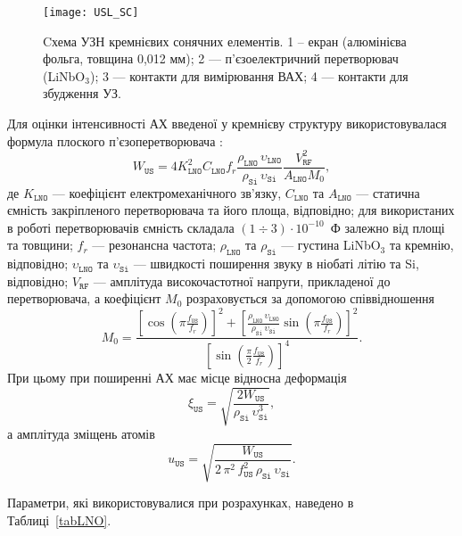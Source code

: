 \begin{figure}
\center
\texttt{[image: USL\_SC]}%
\caption{\label{figUSL:SC}
Cхема УЗН кремнієвих сонячних елементів.
1 --  екран (алюмінієва фольга, товщина 0,012 мм);
2 --- п'єзоелектричний перетворювач (LiNbO$_3$);
3 --- контакти для вимірювання ВАХ;
4 --- контакти для збудження УЗ.
}
\end{figure}


Для оцінки інтенсивності АХ введеної у кремнієву структуру використовувалася формула плоского п’єзоперетворювача \cite{WusBook}:
 \begin{equation}
 \label{eqWus}
 W_\mathtt{US}=4K_\mathtt{LNO}^2C_\mathtt{LNO}f_r\frac{\rho_\mathtt{LNO}\,\upsilon_\mathtt{LNO}}{\rho_\mathtt{Si}\,\upsilon_\mathtt{Si}}\frac{V_\mathtt{RF}^2}{A_\mathtt{LNO}M_0},
 \end{equation}
де
$K_\mathtt{LNO}$ --- коефіцієнт електромеханічного зв'язку,
$C_\mathtt{LNO}$ та $A_\mathtt{LNO}$ --- статична ємність закріпленого перетворювача та його площа, відповідно;
для використаних в роботі перетворювачів ємність складала $(1\div3)\cdot10^{-10}$~Ф залежно від площі та товщини;
$f_r$ --- резонансна частота;
$\rho_\mathtt{LNO}$ та $\rho_\mathtt{Si}$ --- густина LiNbO$_3$ та кремнію, відповідно;
$\upsilon_\mathtt{LNO}$ та $\upsilon_\mathtt{Si}$ --- швидкості поширення звуку в ніобаті літію та Si, відповідно;
$V_\mathtt{RF}$ --- амплітуда високочастотної напруги, прикладеної до перетворювача,
а коефіцієнт $M_0$ розраховується за допомогою співвідношення
 \begin{equation}
 \label{eqM0}
 M_0=\frac{\left[\cos\left(\pi\frac{f_\mathtt{US}}{f_r}\right)\right]^2+\left[\frac{\rho_\mathtt{LNO}\,\upsilon_\mathtt{LNO}}{\rho_\mathtt{Si}\,\upsilon_\mathtt{Si}}\sin\left(\pi\frac{f_\mathtt{US}}{f_r}\right)\right]^2}
 {\left[\sin\left(\frac{\pi}{2}\frac{f_\mathtt{US}}{f_r}\right)\right]^4}.
 \end{equation}
При цьому при поширенні АХ має місце відносна деформація
 \begin{equation}
 \label{eqDefUS}
 \xi_{\mathtt{US}}=\sqrt{\frac{2W_\mathtt{US}}{\rho_\mathtt{Si}\,\upsilon_\mathtt{Si}^3}},
 \end{equation}
а амплітуда зміщень атомів
 \begin{equation}
 \label{eqAmpUS}
 u_{\mathtt{US}}=\sqrt{\frac{W_\mathtt{US}}{2\,\pi^2\,f_\mathtt{US}^2\,\rho_\mathtt{Si}\,\upsilon_\mathtt{Si}}}.
 \end{equation}

Параметри, які використовувалися при розрахунках, наведено в Таблиці~\ref{tabLNO}.


